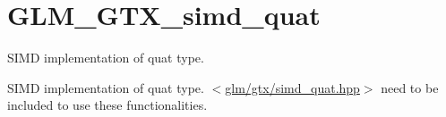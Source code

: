 \hypertarget{group__gtx__simd__quat}{\section{G\-L\-M\-\_\-\-G\-T\-X\-\_\-simd\-\_\-quat}
\label{group__gtx__simd__quat}
}


S\-I\-M\-D implementation of quat type.  


S\-I\-M\-D implementation of quat type. $<$\hyperlink{simd__quat_8hpp}{glm/gtx/simd\-\_\-quat.\-hpp}$>$ need to be included to use these functionalities. 